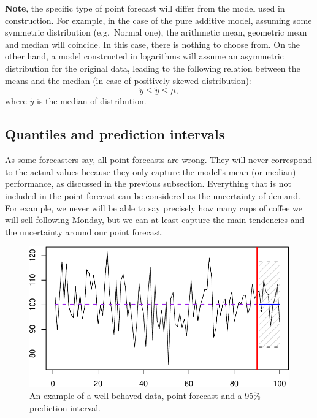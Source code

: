\documentclass[
]{book}
\theoremstyle{definition}
\theoremstyle{definition}
\theoremstyle{definition}
\theoremstyle{definition}
\theoremstyle{remark}
\begin{document}
\textbf{Note}, the specific type of point forecast will differ from the model used in construction. For example, in the case of the pure additive model, assuming some symmetric distribution (e.g.~Normal one), the arithmetic mean, geometric mean and median will coincide. In this case, there is nothing to choose from. On the other hand, a model constructed in logarithms will assume an asymmetric distribution for the original data, leading to the following relation between the means and the median (in case of positively skewed distribution):
\begin{equation}
    \check{y} \leq \tilde{y}\leq \mu ,
    \label{eq:GeoAndArithMeansAndMedian}
\end{equation}
where \(\tilde{y}\) is the median of distribution.

\hypertarget{typesOfForecastsInterval}{%
\subsection{Quantiles and prediction intervals}\label{typesOfForecastsInterval}}

As some forecasters say, all point forecasts are wrong. They will never correspond to the actual values because they only capture the model's mean (or median) performance, as discussed in the previous subsection. Everything that is not included in the point forecast can be considered as the uncertainty of demand. For example, we never will be able to say precisely how many cups of coffee we will sell following Monday, but we can at least capture the main tendencies and the uncertainty around our point forecast.

\begin{figure}
\centering
\includegraphics{Svetunkov--2022----ADAM_files/figure-latex/adamExampleNormal-1.pdf}
\caption{\label{fig:adamExampleNormal}An example of a well behaved data, point forecast and a 95\% prediction interval.}
\end{figure}
\end{document}
